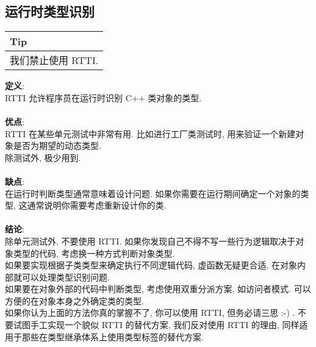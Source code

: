 \documentclass[a4paper,11pt,CJK]{article}
\begin{document}
\begin{CJK}{UTF8}{gbsn}
\subsection{运行时类型识别}
\begin{table}[htbp]
\flushleft
\begin{tabular}{p{400pt}}
\toprule
\rowcolor[gray]{.8} Tip \\
\midrule
我们禁止使用 RTTI.\\
\bottomrule
\end{tabular}
\end{table}
\noindent
\textbf{定义}:\\
\indent RTTI 允许程序员在运行时识别 C++ 类对象的类型.\\
\\
\textbf{优点}:\\
\indent RTTI 在某些单元测试中非常有用. 比如进行工厂类测试时, 用来验证一个新建对象是否为期望的动态类型.\\
\indent 除测试外, 极少用到.\\
\\
\textbf{缺点}:\\
\indent 在运行时判断类型通常意味着设计问题. 如果你需要在运行期间确定一个对象的类型, 这通常说明你需要考虑重新设计你的类.\\
\\
\textbf{结论}:\\
\indent 除单元测试外, 不要使用 RTTI. 如果你发现自己不得不写一些行为逻辑取决于对象类型的代码, 考虑换一种方式判断对象类型.\\
\indent 如果要实现根据子类类型来确定执行不同逻辑代码, 虚函数无疑更合适. 在对象内部就可以处理类型识别问题.\\
\indent 如果要在对象外部的代码中判断类型, 考虑使用双重分派方案, 如访问者模式. 可以方便的在对象本身之外确定类的类型.\\
\indent 如果你认为上面的方法你真的掌握不了, 你可以使用 RTTI, 但务必请三思 :-) . 不要试图手工实现一个貌似 RTTI 的替代方案, 我们反对使用 RTTI 的理由, 同样适用于那些在类型继承体系上使用类型标签的替代方案.


\end{CJK}
\end{document}
